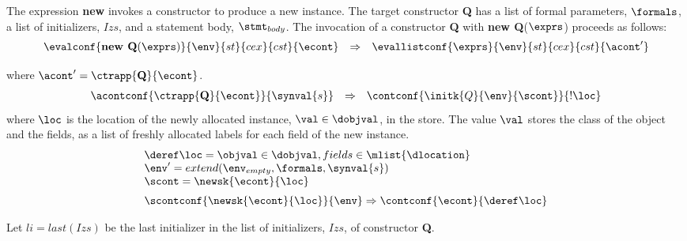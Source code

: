 \documentclass{article}
\begin{document}
The expression \textbf{new} invokes a constructor to produce a new instance. The target constructor \textbf{Q} has a list of formal parameters, $\formals$, a list of initializers, $Izs$, and a statement body, $\stmt_{body}$. The invocation of a constructor \textbf{Q} with \textbf{new Q}($\exprs$) proceeds as follows:
\[
  \begin{array}{lcl}
	\evalconf{\textbf{new Q}(\exprs)}{\env}{st}{cex}{cst}{\econt}
	& \Rightarrow &
	\evallistconf{\exprs}{\env}{st}{cex}{cst}{\acont'}\\[2mm]
  \end{array}
\]
where $\acont' = \ctrapp{\textbf{Q}}{\econt}$.
\[
  \begin{array}{lcl}
	\acontconf{\ctrapp{\textbf{Q}}{\econt}}{\synval{s}}
	& \Rightarrow &
	\contconf{\initk{Q}{\env}{\scont}}{!\loc}
  \end{array}
\]
\noindent
where $\loc$ is the location of the newly allocated instance, $\val \in \dobjval$, in the store. The value $\val$ stores the class of the object and the fields, as a list of freshly allocated labels for each field of the new instance.
\[
  \begin{array}{l}
	\deref\loc = \objval \in \dobjval, fields \in \mlist{\dlocation}\\
	\env' = extend(\env_{empty}, \formals, \synval{s})\\
	\scont = \newsk{\econt}{\loc} \\[2mm]

	\scontconf{\newsk{\econt}{\loc}}{\env}
	\Rightarrow
	\contconf{\econt}{\deref\loc}
  \end{array}
\]

\noindent
Let $li = last(Izs)$ be the last initializer in the list of initializers, $Izs$, of constructor \textbf{Q}.
\end{document}

